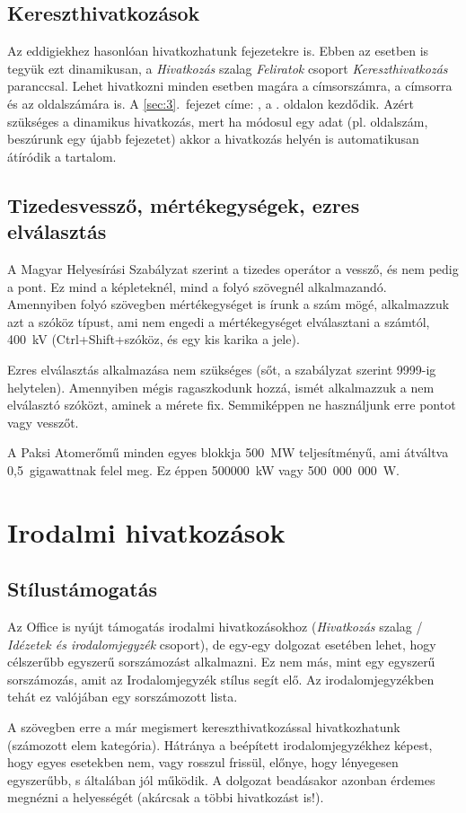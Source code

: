 \documentclass[a4paper, 12pt]{article}
\begin{document}
	\subsection{Kereszthivatkozások}
	Az eddigiekhez hasonlóan hivatkozhatunk fejezetekre is.
	Ebben az esetben is tegyük ezt dinamikusan, a \textit{\textcolor{bme}{Hivatkozás}} szalag \textit{\textcolor{bme}{Feliratok}} csoport \textit{\textcolor{bme}{Kereszthivatkozás}} paranccsal.
	Lehet hivatkozni minden esetben magára a címsorszámra, a címsorra és az oldalszámára is.
	A \ref{sec:3}.~fejezet címe: , a \pageref{sec:3}. oldalon kezdődik.
	Azért szükséges a dinamikus hivatkozás, mert ha módosul egy adat (pl. oldalszám, beszúrunk egy újabb fejezetet) akkor a hivatkozás helyén is automatikusan átíródik a tartalom.

	\subsection{Tizedesvessző, mértékegységek, ezres elválasztás}
	A Magyar Helyesírási Szabályzat szerint a tizedes operátor a vessző, és nem pedig a pont.
	Ez mind a képleteknél, mind a folyó szövegnél alkalmazandó.
	Amennyiben folyó szövegben mértékegységet is írunk a szám mögé, alkalmazzuk azt a szóköz típust, ami nem engedi a mértékegységet elválasztani a számtól, 400~kV (Ctrl+Shift+szóköz, és egy kis karika a jele).
	\par
	Ezres elválasztás alkalmazása nem szükséges (sőt, a szabályzat szerint 9999-ig helytelen).
	Amennyiben mégis ragaszkodunk hozzá, ismét alkalmazzuk a nem elválasztó szóközt, aminek a mérete fix.
	Semmiképpen ne használjunk erre pontot vagy vesszőt. 
	\par
	A Paksi Atomerőmű minden egyes blokkja 500~MW teljesítményű, ami átváltva 0,5~gigawattnak felel meg.
	Ez éppen 500000~kW vagy 500~000~000~W.

	\newpage
	\section{Irodalmi hivatkozások}
	\subsection{Stílustámogatás}
	Az Office is nyújt támogatás irodalmi hivatkozásokhoz (\textit{\textcolor{bme}{Hivatkozás}} szalag / \textit{\textcolor{bme}{Idézetek és irodalomjegyzék}} csoport), de egy-egy dolgozat esetében lehet, hogy célszerűbb egyszerű sorszámozást alkalmazni.
	Ez nem más, mint egy egyszerű sorszámozás, amit az Irodalomjegyzék stílus segít elő. Az irodalomjegyzékben tehát ez valójában egy sorszámozott lista.
	\par
	A szövegben erre a már megismert kereszthivatkozással hivatkozhatunk (számozott elem kategória).
	Hátránya a beépített irodalomjegyzékhez képest, hogy egyes esetekben nem, vagy rosszul frissül, előnye, hogy lényegesen egyszerűbb, s általában jól működik.
	A dolgozat beadásakor azonban érdemes megnézni a helyességét (akárcsak a többi hivatkozást is!).
\end{document}
